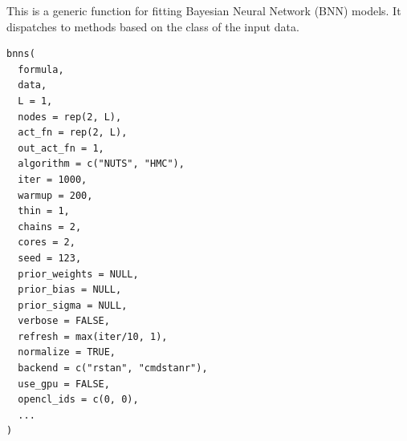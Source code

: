 \documentclass[a4paper]{book}
\begin{document}
%
\begin{Description}
This is a generic function for fitting Bayesian Neural Network (BNN) models. It dispatches to methods based on the class of the input data.
\end{Description}
%
\begin{Usage}
\begin{verbatim}
bnns(
  formula,
  data,
  L = 1,
  nodes = rep(2, L),
  act_fn = rep(2, L),
  out_act_fn = 1,
  algorithm = c("NUTS", "HMC"),
  iter = 1000,
  warmup = 200,
  thin = 1,
  chains = 2,
  cores = 2,
  seed = 123,
  prior_weights = NULL,
  prior_bias = NULL,
  prior_sigma = NULL,
  verbose = FALSE,
  refresh = max(iter/10, 1),
  normalize = TRUE,
  backend = c("rstan", "cmdstanr"),
  use_gpu = FALSE,
  opencl_ids = c(0, 0),
  ...
)
\end{verbatim}
\end{Usage}
%
\end{document}
